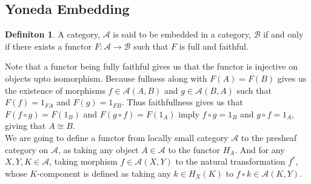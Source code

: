 \documentclass[18pt,a4paper]{article}
\theoremstyle{definition}
\newtheorem{definition}[theorem]{Definiton}
\begin{document}
	\subsection{Yoneda Embedding}%
	\begin{definition} %
		A category, $\mathcal{A}$  is said to be embedded in a category, $\mathcal{B}$ if
		and only if there exists a functor $F: \mathcal{A} \to \mathcal{B}$
		such that $F$ is full and faithful.
	\end{definition} %

	Note that a functor being fully faithful gives us that the functor is injective on objects upto
	isomorphism. Because fullness along with $F(A)=F(B)$ gives us the existence of morphisms
	$f\in \mathcal{A} (A,B)$ and $g \in \mathcal{A} (B,A)$ such that $F(f)=1_{FA}$ and
	$F(g)=1_{FB}$. Thus faithfullness gives us that $F(f \circ g)=F(1_B)$ and $F(g \circ f)=F(1_A)$
	imply $f \circ g=1_B$ and $g \circ f = 1_A$, giving that $A\cong B$.\\



	We are going to define a functor from locally small category $\mathcal{A}$ to the presheaf category on
	$\mathcal{A} $, as taking any object $A \in \mathcal{A} $ to the functor $H_A$.
	And for any $X,Y,K \in \mathcal{A}$, taking morphism $f\in \mathcal{A} (X,Y)$
	to the natural transformation $f^*$, whose $K$-component is defined as taking any $k \in H_X(K)$
	to $f \circ k \in \mathcal{A} (K,Y)$.
\end{document}
